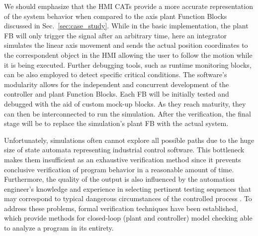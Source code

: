 \documentclass{ieeeojies}
\begin{document}
We should emphasize that the HMI CATs provide a more accurate representation of the system behavior when compared to the axis plant Function Blocks discussed in \mbox{Sec. \ref{sec:case_study}}. While in the basic implementation, the plant FB will only trigger the  signal after an arbitrary time, here an integrator simulates the linear axis movement and sends the actual position coordinates to the correspondent object in the HMI allowing the user to follow the motion while it is being executed. Further debugging tools, such as runtime monitoring blocks, can be also employed to detect specific critical conditions.
The software's modularity allows for the independent and concurrent development of the controller and plant Function Blocks. Each FB will be initially tested and debugged with the aid of custom mock-up blocks. As they reach maturity, they can then be interconnected to run the simulation. After the verification, the final stage will be to replace the simulation's plant FB with the actual system. 

Unfortunately, simulations often cannot explore all possible paths due to the huge size of state automata representing industrial control software. This bottleneck makes them insufficient as an exhaustive verification method since it prevents conclusive verification of program behavior in a reasonable amount of time. Furthermore, the quality of the output is also influenced by the automation engineer's knowledge and experience in selecting pertinent testing sequences that may correspond to typical dangerous circumstances of the controlled process \cite{Schnakenbourg2002}. 
To address these problems, formal verification techniques have been established, which provide methods for closed-loop (plant and controller) model checking able to analyze a program in its entirety.
\end{document}
